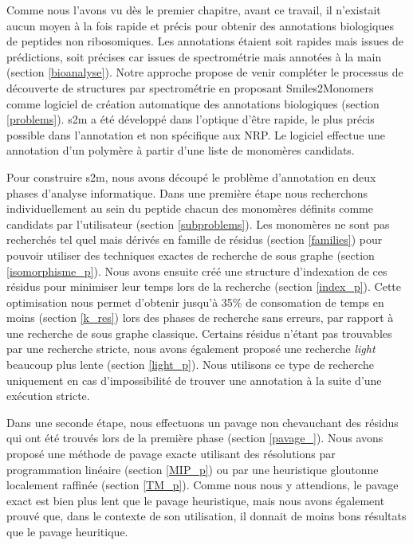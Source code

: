Comme nous l'avons vu dès le premier chapitre, avant ce travail, il n'existait aucun moyen à la fois rapide et précis pour obtenir des annotations biologiques de peptides non ribosomiques.
Les annotations étaient soit rapides mais issues de prédictions, soit précises car issues de spectrométrie mais annotées à la main (section \ref{bioanalyse}).
Notre approche propose de venir compléter le processus de découverte de structures par spectrométrie en proposant Smiles2Monomers comme logiciel de création automatique des annotations biologiques (section \ref{problems}).
s2m a été développé dans l'optique d'être rapide, le plus précis possible dans l'annotation et non spécifique aux NRP.
Le logiciel effectue une annotation d'un polymère à partir d'une liste de monomères candidats.

Pour construire s2m, nous avons découpé le problème d'annotation en deux phases d'analyse informatique.
Dans une première étape nous recherchons individuellement au sein du peptide chacun des monomères définits comme candidats par l'utilisateur (section \ref{subproblems}).
Les monomères ne sont pas recherchés tel quel mais dérivés en famille de résidus (section \ref{families}) pour pouvoir utiliser des techniques exactes de recherche de sous graphe (section \ref{isomorphisme_p}).
Nous avons ensuite créé une structure d'indexation de ces résidus pour minimiser leur temps lors de la recherche (section \ref{index_p}).
Cette optimisation nous permet d'obtenir jusqu'à 35\% de consomation de temps en moins (section \ref{k_res}) lors des phases de recherche sans erreurs, par rapport à une recherche de sous graphe classique.
Certains résidus n'étant pas trouvables par une recherche stricte, nous avons également proposé une recherche \textit{light} beaucoup plus lente (section \ref{light_p}). Nous utilisons ce type de recherche uniquement en cas d'impossibilité de trouver une annotation à la suite d'une exécution stricte.

Dans une seconde étape, nous effectuons un pavage non chevauchant des résidus qui ont été trouvés lors de la première phase (section \ref{pavage_}).
Nous avons proposé une méthode de pavage exacte utilisant des résolutions par programmation linéaire (section \ref{MIP_p}) ou par une heuristique gloutonne localement raffinée (section \ref{TM_p}).
Comme nous nous y attendions, le pavage exact est bien plus lent que le pavage heuristique, mais nous avons également prouvé que, dans le contexte de son utilisation, il donnait de moins bons résultats que le pavage heuritique.

